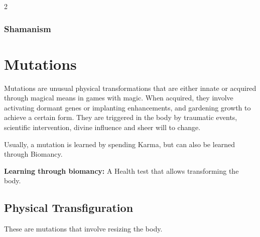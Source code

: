 \begin{multicols}{2}
\subsubsection{\magic Shamanism}



\section{\magic Mutations}

Mutations are unusual physical transformations that are either innate or acquired through magical means in games with magic. When acquired, they involve activating dormant genes or implanting enhancements, and gardening growth to achieve a certain form. They are triggered in the body by traumatic events, scientific intervention, divine influence and sheer will to change.

Usually, a mutation is learned by spending Karma, but can also be learned through Biomancy. 

\textbf{Learning through biomancy:} A Health test that allows transforming the body.  


\subsection{Physical Transfiguration}

These are mutations that involve resizing the body.





\end{multicols}
